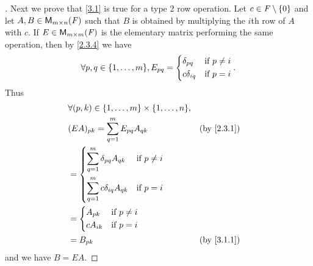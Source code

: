 \begin{proof}[]
	Next we prove that \cref{3.1} is true for a type 2 row operation.
	Let \(c \in \mathit{F} \setminus \left\lbrace0\right\rbrace\) and let \(A, B \in \ms\) such that \(B\) is obtained by multiplying the \(i\)th row of \(A\) with \(c\).
	If \(E \in \ms[m][m][\F]\) is the elementary matrix performing the same operation, then by \cref{2.3.4} we have
	\[
		\forall p, q \in \set{1, \dots, m}, E_{p q} = \begin{dcases}
			\delta_{p q}   & \text{if } p \neq i \\
			c \delta_{i q} & \text{if } p = i
		\end{dcases}.
	\]
	Thus
	\begin{align*}
		 & \forall (p, k) \in \set{1, \dots, m} \times \set{1, \dots, n},                 \\
		 & (EA)_{p k} = \sum_{q = 1}^m E_{p q} A_{q k}                    &  & \by{2.3.1} \\
		 & = \begin{dcases}
			     \sum_{q = 1}^m \delta_{p q} A_{q k}   & \text{if } p \neq i \\
			     \sum_{q = 1}^m c \delta_{i q} A_{q k} & \text{if } p = i
		     \end{dcases}                  \\
		 & = \begin{dcases}
			     A_{p k}   & \text{if } p \neq i \\
			     c A_{i k} & \text{if } p = i
		     \end{dcases}                                              \\
		 & = B_{p k}                                                      &  & \by{3.1.1}
	\end{align*}
	and we have \(B = EA\).


\end{proof}
